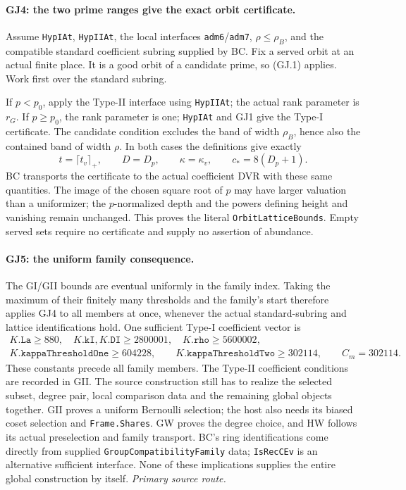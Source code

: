 \documentclass[11pt,a4paper]{article}
\numberwithin{equation}{section}
\theoremstyle{remark}\newtheorem{remark}[theorem]{Remark}
\begin{document}
\paragraph{GJ4: the two prime ranges give the exact orbit certificate.}
Assume \texttt{HypIAt}, \texttt{HypIIAt}, the local interfaces
\texttt{adm6}/\texttt{adm7}, $\rho\le\rho_B$, and the compatible
standard coefficient subring supplied by BC. Fix a served orbit at an
actual finite place. It is a good orbit of a candidate prime, so (GJ.1)
applies. Work first over the standard subring.

If $p<p_0$, apply the Type-II interface using \texttt{HypIIAt}; the
actual rank parameter is $r_G$. If $p\ge p_0$, the rank parameter is
one; \texttt{HypIAt} and GJ1 give the Type-I certificate. The candidate
condition excludes the band of width $\rho_B$, hence also the contained
band of width $\rho$. In both cases the definitions give exactly
\[
 t=\lceil t_v\rceil_+,\qquad D=D_p,\qquad
 \kappa=\kappa_v,\qquad c_*=8(D_p+1).                 \tag{GJ.2}
\]
BC transports the certificate to the actual coefficient DVR with
these same quantities. The image of the chosen square root of $p$
may have larger valuation than a uniformizer; the $p$-normalized
depth and the powers defining height and vanishing remain unchanged.
This proves the literal \texttt{OrbitLatticeBounds}. Empty served sets
require no certificate and supply no assertion of abundance.

\paragraph{GJ5: the uniform family consequence.}
The GI/GII bounds are eventual uniformly in the family index. Taking
the maximum of their finitely many thresholds and the family's start
therefore applies GJ4 to all members at once, whenever the actual
standard-subring and lattice identifications hold. One sufficient
Type-I coefficient vector is
\[
\begin{gathered}
 K.\texttt{La}\ge880,\quad K.\texttt{kI},K.\texttt{DI}\ge2800001,
 \quad K.\texttt{rho}\ge5600002,\\
 K.\texttt{kappaThresholdOne}\ge604228,\qquad
 K.\texttt{kappaThresholdTwo}\ge302114,\qquad C_m=302114.
\end{gathered}                                                   \tag{GJ.3}
\]
These constants precede all family members. The Type-II coefficient
conditions are recorded in GII. The source construction still has to
realize the selected subset, degree pair, local comparison data and the
remaining global objects together. GII proves a uniform Bernoulli
selection; the host also needs its biased coset selection and
\texttt{Frame.Shares}. GW proves the degree choice, and HW follows its
actual preselection and family transport. BC's ring identifications
come directly from supplied \texttt{GroupCompatibilityFamily} data;
\texttt{IsRecCEv} is an alternative sufficient interface. None of these
implications supplies the entire global construction by itself.
\noindent\textit{Primary source route.}\cite{family-orbit-join}
\end{document}
